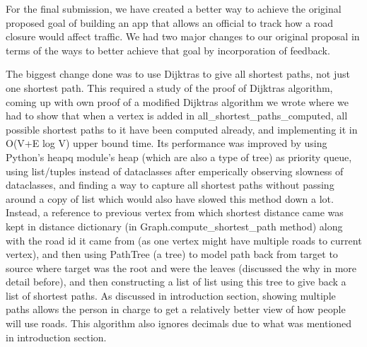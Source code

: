 \documentclass[fontsize=11pt]{article}
\begin{document}
For the final submission, we have created a better way to achieve the original proposed goal of building an app that allows an official to track how a road closure would affect traffic. We had two major changes to our original proposal in terms of the ways to better achieve that goal by incorporation of feedback.

The biggest change done was to use Dijktras to give all shortest paths, not just one shortest path. This required a study of the proof of Dijktras algorithm, coming up with own proof of a modified Dijktras algorithm we wrote where we had to show that when a vertex is added in all\_shortest\_paths\_computed, all possible shortest paths to it have been computed already, and implementing it in O(V+E log V) upper bound time.
Its performance was improved by using Python's heapq module's heap (which are also a type of tree) as priority queue, using list/tuples instead of dataclasses after emperically observing slowness of dataclasses, and finding a way to capture all shortest paths without passing around a copy of list which would also have slowed this method down a lot. Instead, a reference to previous vertex from which shortest distance came was kept in distance dictionary (in Graph.compute\_shortest\_path method) along with the road id it came from (as one vertex might have multiple roads to current vertex), and then using PathTree (a tree) to model path back from target to source where target was the root and were the leaves (discussed the why in more detail before), and then constructing a list of list using this tree to give back a list of shortest paths. As discussed in introduction section, showing multiple paths allows the person in charge to get a relatively better view of how people will use roads. This algorithm also ignores decimals due to what was mentioned in introduction section.
\end{document}
